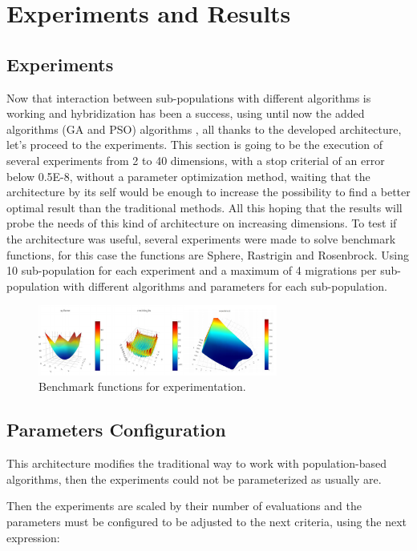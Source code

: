 \documentclass[runningheads]{llncs}
\begin{document}
  \section{Experiments and Results}
  \label{sec:exp}
  
\subsection{Experiments}
Now that interaction between sub-populations with different algorithms is
working and hybridization has been a success, using until now the added
algorithms (GA and PSO) algorithms \cite{Kramer2017,Guerrero2017,Lalwani2019},
all thanks to the developed architecture, let's proceed to the experiments. This
section is going to be the execution of several experiments from 2 to 40
dimensions, with a stop criterial of an error below 0.5E-8, without a parameter
optimization method, waiting that the architecture by its self would be enough
to increase the possibility to find a better optimal result than the traditional
methods. All this hoping that the results will probe the needs of this kind of
architecture on increasing dimensions. To test if the architecture was useful,
several experiments were made to solve benchmark functions, for this case the
functions are Sphere, Rastrigin and Rosenbrock. Using 10 sub-population for each
experiment and a maximum of 4 migrations per sub-population with different
algorithms and parameters for each sub-population.

\begin{figure}[htp]
  \centering
    \includegraphics[width=0.7\textwidth]{img/benchmark.png}
    \caption{Benchmark functions for experimentation.} \label{fig6}
    \end{figure}

\subsection{Parameters Configuration} 

This architecture modifies the traditional way to work with population-based
algorithms, then the experiments could not be parameterized as usually are.

Then the experiments are scaled by their number of evaluations and the
parameters must be configured to be adjusted to the next criteria, using the
next expression:
\end{document}
